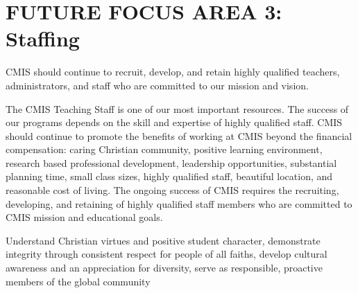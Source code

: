 \section{FUTURE FOCUS AREA 3: Staffing}

CMIS should continue to recruit, develop, and retain highly qualified teachers, administrators, and staff who are committed to our mission and vision. 


The CMIS Teaching Staff is one of our most important resources. The success of our programs depends on the skill and expertise of highly qualified staff. CMIS should continue to promote the benefits of working at CMIS beyond the financial compensation: caring Christian community, positive learning environment, research based professional development, leadership opportunities, substantial planning time, small class sizes, highly qualified staff, beautiful location, and reasonable cost of living. The ongoing success of CMIS requires the recruiting, developing, and retaining of highly qualified staff members who are committed to CMIS mission and educational goals.


Understand Christian virtues and positive student character, demonstrate integrity through consistent respect for people of all faiths, develop cultural awareness and an appreciation for diversity, serve as responsible, proactive members of the global community

